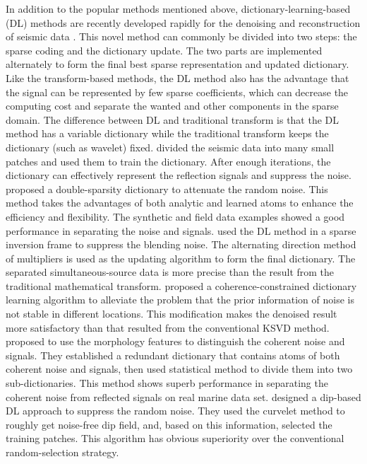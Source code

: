 In addition to the popular methods mentioned above, dictionary-learning-based (DL) methods are recently developed rapidly for the denoising and reconstruction of seismic data \cite{lingchen2015multiscale,Siahsar2017multitask,yangkang2020sgk}. This novel method can commonly be divided into two steps: the sparse coding and the dictionary update. The two parts are implemented alternately to form the final best sparse representation and updated dictionary. Like the transform-based methods, the DL method also has the advantage that the signal can be represented by few sparse coefficients, which can decrease the computing cost and separate the wanted and other components in the sparse domain. The difference between DL and traditional transform is that the DL method has a variable dictionary while the traditional transform keeps the dictionary (such as wavelet) fixed. \cite{Beckouche2014dl} divided the seismic data into many small patches and used them to train the dictionary. After enough iterations, the dictionary can effectively represent the reflection signals and suppress the noise. \cite{yangkang2016double} proposed a double-sparsity dictionary to attenuate the random noise. This method takes the advantages of both analytic and learned atoms to enhance the efficiency and flexibility. The synthetic and field data examples showed a good performance in separating the noise and signals. \cite{zhouy2016patchwise} used the DL method in a sparse inversion frame to suppress the blending noise. The alternating direction method of multipliers is used as the updating algorithm to form the final dictionary. The separated simultaneous-source data is more precise than the result from the traditional mathematical transform. \cite{turquais2017coherence} proposed a coherence-constrained dictionary learning algorithm to alleviate the problem that the prior information of noise is not stable in different locations. This modification makes the denoised result more satisfactory than that resulted from the conventional KSVD method.  \cite{Turquais2017morphology} proposed to use the morphology features to distinguish the coherent noise and signals. They established a redundant dictionary that contains atoms of both coherent noise and signals, then used statistical method to divide them into two sub-dictionaries. This method shows superb performance in separating the coherent noise from reflected signals on real marine data set. \cite{shaohuan2019dippatch} designed a dip-based DL approach to suppress the random noise. They used the curvelet method to roughly get noise-free dip field, and, based on this information, selected the training patches. This algorithm has obvious superiority over the conventional random-selection strategy. 


